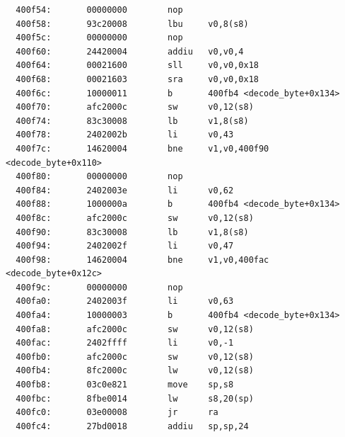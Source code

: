 \documentclass[11pt]{article}
\begin{document}
\begin{verbatim}
  400f54:       00000000        nop
  400f58:       93c20008        lbu     v0,8(s8)
  400f5c:       00000000        nop
  400f60:       24420004        addiu   v0,v0,4
  400f64:       00021600        sll     v0,v0,0x18
  400f68:       00021603        sra     v0,v0,0x18
  400f6c:       10000011        b       400fb4 <decode_byte+0x134>
  400f70:       afc2000c        sw      v0,12(s8)
  400f74:       83c30008        lb      v1,8(s8)
  400f78:       2402002b        li      v0,43
  400f7c:       14620004        bne     v1,v0,400f90 <decode_byte+0x110>
  400f80:       00000000        nop
  400f84:       2402003e        li      v0,62
  400f88:       1000000a        b       400fb4 <decode_byte+0x134>
  400f8c:       afc2000c        sw      v0,12(s8)
  400f90:       83c30008        lb      v1,8(s8)
  400f94:       2402002f        li      v0,47
  400f98:       14620004        bne     v1,v0,400fac <decode_byte+0x12c>
  400f9c:       00000000        nop
  400fa0:       2402003f        li      v0,63
  400fa4:       10000003        b       400fb4 <decode_byte+0x134>
  400fa8:       afc2000c        sw      v0,12(s8)
  400fac:       2402ffff        li      v0,-1
  400fb0:       afc2000c        sw      v0,12(s8)
  400fb4:       8fc2000c        lw      v0,12(s8)
  400fb8:       03c0e821        move    sp,s8
  400fbc:       8fbe0014        lw      s8,20(sp)
  400fc0:       03e00008        jr      ra
  400fc4:       27bd0018        addiu   sp,sp,24


\end{verbatim}
\end{document}

